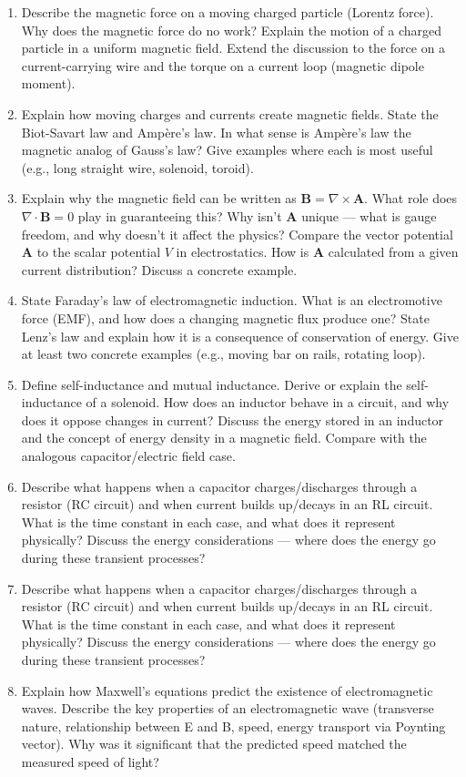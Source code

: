 \documentclass[11pt]{article}
\begin{document}
\begin{enumerate}
\item Describe the magnetic force on a moving charged particle (Lorentz force). Why does the magnetic force do no work? Explain the motion of a charged particle in a uniform magnetic field. Extend the discussion to the force on a current-carrying wire and the torque on a current loop (magnetic dipole moment).
\item Explain how moving charges and currents create magnetic fields. State the Biot-Savart law and Ampère's law. In what sense is Ampère's law the magnetic analog of Gauss's law? Give examples where each is most useful (e.g., long straight wire, solenoid, toroid).
\item Explain why the magnetic field can be written as $\mathbf{B} = \nabla \times \mathbf{A}$. What role does $\nabla \cdot \mathbf{B} = 0$ play in guaranteeing this? Why isn't $\mathbf{A}$ unique — what is gauge freedom, and why doesn't it affect the physics? Compare the vector potential $\mathbf{A}$ to the scalar potential $V$ in electrostatics. How is $\mathbf{A}$ calculated from a given current distribution? Discuss a concrete example.
\item State Faraday's law of electromagnetic induction. What is an electromotive force (EMF), and how does a changing magnetic flux produce one? State Lenz's law and explain how it is a consequence of conservation of energy. Give at least two concrete examples (e.g., moving bar on rails, rotating loop).
\item Define self-inductance and mutual inductance. Derive or explain the self-inductance of a solenoid. How does an inductor behave in a circuit, and why does it oppose changes in current? Discuss the energy stored in an inductor and the concept of energy density in a magnetic field. Compare with the analogous capacitor/electric field case.
\item Describe what happens when a capacitor charges/discharges through a resistor (RC circuit) and when current builds up/decays in an RL circuit. What is the time constant in each case, and what does it represent physically? Discuss the energy considerations — where does the energy go during these transient processes?
\item Describe what happens when a capacitor charges/discharges through a resistor (RC circuit) and when current builds up/decays in an RL circuit. What is the time constant in each case, and what does it represent physically? Discuss the energy considerations — where does the energy go during these transient processes?
\item Explain how Maxwell's equations predict the existence of electromagnetic waves. Describe the key properties of an electromagnetic wave (transverse nature, relationship between E and B, speed, energy transport via Poynting vector). Why was it significant that the predicted speed matched the measured speed of light?

\end{enumerate}
\end{document}
